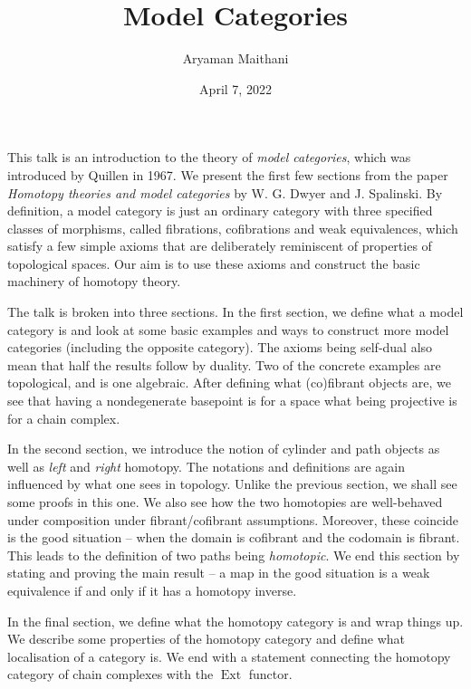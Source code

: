 \documentclass[12pt]{article}
\title{Model Categories}
\author{Aryaman Maithani}
\date{April 7, 2022}
\begin{document}
\maketitle

This talk is an introduction to the theory of \emph{model categories}, which was introduced by Quillen in 1967. We present the first few sections from the paper \emph{Homotopy theories and model categories} by W. G. Dwyer and J. Spalinski. By definition, a model category is just an ordinary category with three specified classes of morphisms, called fibrations, cofibrations and weak equivalences, which satisfy a few simple axioms that are deliberately reminiscent of properties of topological spaces. Our aim is to use these axioms and construct the basic machinery of homotopy theory.

The talk is broken into three sections. In the first section, we define what a model category is and look at some basic examples and ways to construct more model categories (including the opposite category). The axioms being self-dual also mean that half the results follow by duality. Two of the concrete examples are topological, and is one algebraic. After defining what (co)fibrant objects are, we see that having a nondegenerate basepoint is for a space what being projective is for a chain complex. 

In the second section, we introduce the notion of cylinder and path objects as well as \emph{left} and \emph{right} homotopy. The notations and definitions are again influenced by what one sees in topology. Unlike the previous section, we shall see some proofs in this one. We also see how the two homotopies are well-behaved under composition under fibrant/cofibrant assumptions. Moreover, these coincide is the good situation -- when the domain is cofibrant and the codomain is fibrant. This leads to the definition of two paths being \emph{homotopic}. We end this section by stating and proving the main result -- a map in the good situation is a weak equivalence if and only if it has a homotopy inverse.

In the final section, we define what the homotopy category is and wrap things up. We describe some properties of the homotopy category and define what localisation of a category is. We end with a statement connecting the homotopy category of chain complexes with the $\operatorname{Ext}$ functor.
\end{document}
